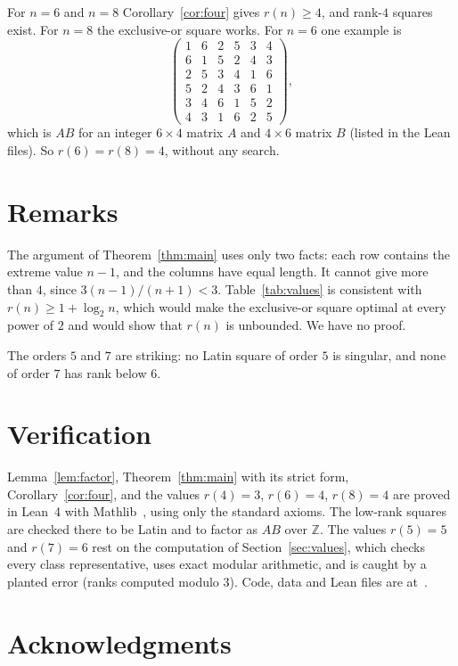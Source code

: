 \documentclass[11pt]{amsart}
\theoremstyle{remark}
\begin{document}
For $n=6$ and $n=8$ Corollary~\ref{cor:four} gives $r(n)\ge4$, and rank-$4$ squares exist. For $n=8$ the exclusive-or square works. For $n=6$ one example is
\[
\begin{pmatrix}
1&6&2&5&3&4\\6&1&5&2&4&3\\2&5&3&4&1&6\\5&2&4&3&6&1\\3&4&6&1&5&2\\4&3&1&6&2&5
\end{pmatrix},
\]
which is $AB$ for an integer $6\times4$ matrix $A$ and $4\times6$ matrix $B$ (listed in the Lean files). So $r(6)=r(8)=4$, without any search.

\section{Remarks}

The argument of Theorem~\ref{thm:main} uses only two facts: each row contains the extreme value $n-1$, and the columns have equal length. It cannot give more than $4$, since $3(n-1)/(n+1)<3$. Table~\ref{tab:values} is consistent with $r(n)\ge1+\log_2 n$, which would make the exclusive-or square optimal at every power of $2$ and would show that $r(n)$ is unbounded. We have no proof.

The orders $5$ and $7$ are striking: no Latin square of order $5$ is singular, and none of order $7$ has rank below $6$.

\section{Verification}

Lemma~\ref{lem:factor}, Theorem~\ref{thm:main} with its strict form, Corollary~\ref{cor:four}, and the values $r(4)=3$, $r(6)=4$, $r(8)=4$ are proved in Lean~4 with Mathlib~\cite{mathlib}, using only the standard axioms. The low-rank squares are checked there to be Latin and to factor as $AB$ over $\mathbb Z$. The values $r(5)=5$ and $r(7)=6$ rest on the computation of Section~\ref{sec:values}, which checks every class representative, uses exact modular arithmetic, and is caught by a planted error (ranks computed modulo $3$). Code, data and Lean files are at~\cite{repo}.

\section*{Acknowledgments}
\end{document}
